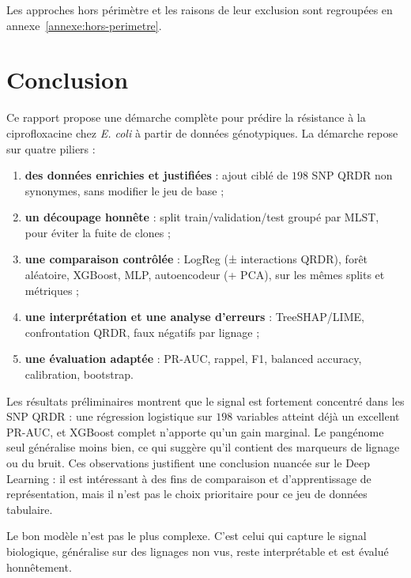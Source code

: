 \documentclass[11pt,a4paper]{article}
\begin{document}
Les approches hors périmètre et les raisons de leur exclusion sont regroupées en annexe~\ref{annexe:hors-perimetre}.

\section{Conclusion}

Ce rapport propose une démarche complète pour prédire la résistance à la ciprofloxacine chez \textit{E. coli} à partir de données génotypiques. La démarche repose sur quatre piliers :

\begin{enumerate}[leftmargin=1.4em]
    \item \textbf{des données enrichies et justifiées} : ajout ciblé de $198$ SNP QRDR non synonymes, sans modifier le jeu de base ;
    \item \textbf{un découpage honnête} : split train/validation/test groupé par MLST, pour éviter la fuite de clones ;
    \item \textbf{une comparaison contrôlée} : LogReg (± interactions QRDR), forêt aléatoire, XGBoost, MLP, autoencodeur (+ PCA), sur les mêmes splits et métriques ;
    \item \textbf{une interprétation et une analyse d'erreurs} : TreeSHAP/LIME, confrontation QRDR, faux négatifs par lignage ;
    \item \textbf{une évaluation adaptée} : PR-AUC, rappel, F1, balanced accuracy, calibration, bootstrap.
\end{enumerate}

Les résultats préliminaires montrent que le signal est fortement concentré dans les SNP QRDR : une régression logistique sur $198$ variables atteint déjà un excellent PR-AUC, et XGBoost complet n'apporte qu'un gain marginal. Le pangénome seul généralise moins bien, ce qui suggère qu'il contient des marqueurs de lignage ou du bruit. Ces observations justifient une conclusion nuancée sur le Deep Learning : il est intéressant à des fins de comparaison et d'apprentissage de représentation, mais il n'est pas le choix prioritaire pour ce jeu de données tabulaire.

\begin{keybox}
Le bon modèle n'est pas le plus complexe. C'est celui qui capture le signal biologique, généralise sur des lignages non vus, reste interprétable et est évalué honnêtement.
\end{keybox}
\end{document}
